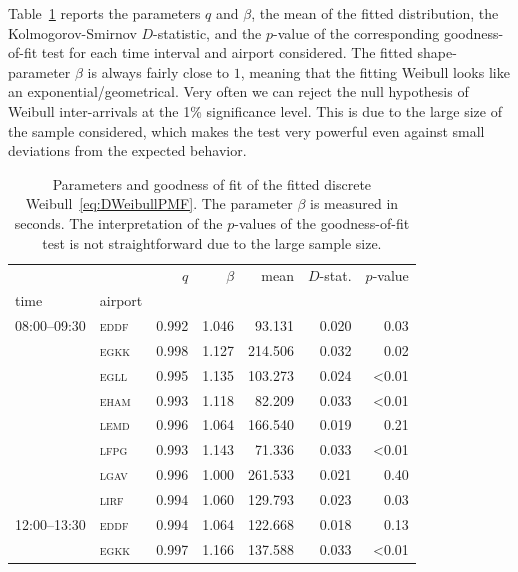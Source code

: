 \documentclass[draft,review]{elsarticle}
\newcommand{\airp}[1]{\textcolor{#1}{\textsc{#1}}}
\begin{document}
Table~\ref{tab:fitted} reports the parameters \(q\) and \(\beta\), the mean of the fitted distribution, the Kolmogorov-Smirnov \(D\)-statistic, and the \(p\)-value of the corresponding goodness-of-fit test for each time interval and airport considered.
The fitted shape-parameter \(\beta\) is always fairly close to \(1\), meaning that the fitting Weibull looks like an exponential/geometrical.
Very often we can reject the null hypothesis of Weibull inter-arrivals at the 1\% significance level.
This is due to the large size of the sample considered, which makes the test very powerful even against small deviations from the expected behavior.

\begin{table}
    \centering
    \caption{Parameters and goodness of fit of the fitted discrete Weibull~\eqref{eq:DWeibullPMF}. The parameter \(\beta\) is measured in seconds. The interpretation of the \(p\)-values of the goodness-of-fit test is not straightforward due to the large sample size.}
    \label{tab:fitted}
    \begin{tabular}{llrrrrr}
      \toprule
                   &             &   \(q\) & \(\beta\) &    mean & \(D\)-stat. & \(p\)-value \\
      time & airport &       &         &         &           &           \\
      \midrule
      08:00--09:30 & \airp{eddf} & 0.992 &   1.046 &  93.131 &     0.020 &      0.03 \\
                   & \airp{egkk} & 0.998 &   1.127 & 214.506 &     0.032 &      0.02 \\
                   & \airp{egll} & 0.995 &   1.135 & 103.273 &     0.024 &     <0.01 \\
                   & \airp{eham} & 0.993 &   1.118 &  82.209 &     0.033 &     <0.01 \\
                   & \airp{lemd} & 0.996 &   1.064 & 166.540 &     0.019 &      0.21 \\
                   & \airp{lfpg} & 0.993 &   1.143 &  71.336 &     0.033 &     <0.01 \\
                   & \airp{lgav} & 0.996 &   1.000 & 261.533 &     0.021 &      0.40 \\
                   & \airp{lirf} & 0.994 &   1.060 & 129.793 &     0.023 &      0.03 \\
      12:00--13:30 & \airp{eddf} & 0.994 &   1.064 & 122.668 &     0.018 &      0.13 \\
                   & \airp{egkk} & 0.997 &   1.166 & 137.588 &     0.033 &     <0.01 \\

\end{tabular}
\end{table}
\end{document}
